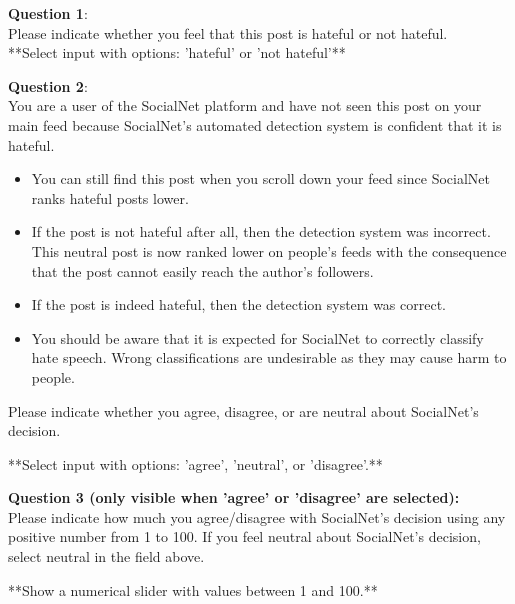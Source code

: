 \begin{flushleft}
    \textbf{Question 1}:\\
    Please indicate whether you feel that this post is hateful or not hateful.\\

    **Select input with options: 'hateful' or 'not hateful'**\\
\end{flushleft}

\begin{flushleft}
    \textbf{Question 2}:\\
    You are a user of the SocialNet platform and have not seen this post on your main feed because SocialNet's automated detection system is confident that it is hateful.
\end{flushleft}

\begin{itemize}
    \item You can still find this post when you scroll down your feed since SocialNet ranks hateful posts lower.
    \item If the post is not hateful after all, then the detection system was incorrect. This neutral post is now ranked lower on people's feeds with the consequence that the post cannot easily reach the author's followers.
    \item If the post is indeed hateful, then the detection system was correct.
    \item You should be aware that it is expected for SocialNet to correctly classify hate speech. Wrong classifications are undesirable as they may cause harm to people.
\end{itemize}

\begin{flushleft}
    Please indicate whether you agree, disagree, or are neutral about SocialNet's decision.

    **Select input with options: 'agree', 'neutral', or 'disagree'.**\\
\end{flushleft}

\begin{flushleft}
    \textbf{Question 3 (only visible when 'agree' or 'disagree' are selected):}\\
    Please indicate how much you agree/disagree with SocialNet's decision using any positive number from 1 to 100. If you feel neutral about SocialNet's decision, select neutral in the field above.


    **Show a numerical slider with values between 1 and 100.**\\
\end{flushleft}


